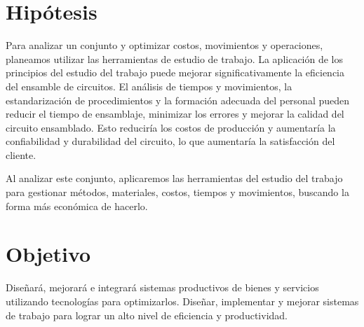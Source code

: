 \section{Hipótesis}
% 
% 
Para analizar un conjunto y optimizar costos, movimientos y operaciones, planeamos utilizar las herramientas de estudio de trabajo. La aplicación de los principios del estudio del trabajo puede mejorar significativamente la eficiencia del ensamble de circuitos. El análisis de tiempos y movimientos, la estandarización de procedimientos y la formación adecuada del personal pueden reducir el tiempo de ensamblaje, minimizar los errores y mejorar la calidad del circuito ensamblado. Esto reduciría los costos de producción y aumentaría la confiabilidad y durabilidad del circuito, lo que aumentaría la satisfacción del cliente.

Al analizar este conjunto, aplicaremos las herramientas del estudio del trabajo para gestionar métodos, materiales, costos, tiempos y movimientos, buscando la forma más económica de hacerlo.
% 
% 
% 
% 
\section{Objetivo}

% 
% 
% 
% 
Diseñará, mejorará e integrará sistemas productivos de bienes y servicios utilizando tecnologías para optimizarlos.
Diseñar, implementar y mejorar sistemas de trabajo para lograr un alto nivel de eficiencia y productividad.
% 
% 
